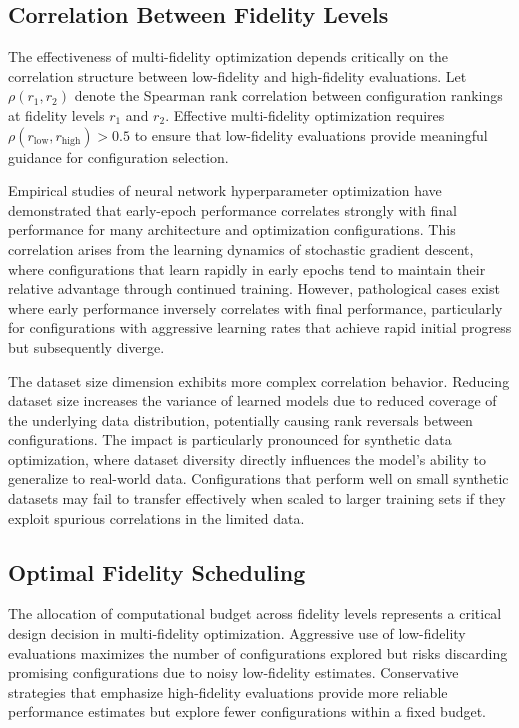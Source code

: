 \subsection{Correlation Between Fidelity Levels}

The effectiveness of multi-fidelity optimization depends critically on the correlation structure between low-fidelity and high-fidelity evaluations. Let $\rho(r_1, r_2)$ denote the Spearman rank correlation between configuration rankings at fidelity levels $r_1$ and $r_2$. Effective multi-fidelity optimization requires $\rho(r_{\text{low}}, r_{\text{high}}) > 0.5$ to ensure that low-fidelity evaluations provide meaningful guidance for configuration selection.

Empirical studies of neural network hyperparameter optimization have demonstrated that early-epoch performance correlates strongly with final performance for many architecture and optimization configurations. This correlation arises from the learning dynamics of stochastic gradient descent, where configurations that learn rapidly in early epochs tend to maintain their relative advantage through continued training. However, pathological cases exist where early performance inversely correlates with final performance, particularly for configurations with aggressive learning rates that achieve rapid initial progress but subsequently diverge.

The dataset size dimension exhibits more complex correlation behavior. Reducing dataset size increases the variance of learned models due to reduced coverage of the underlying data distribution, potentially causing rank reversals between configurations. The impact is particularly pronounced for synthetic data optimization, where dataset diversity directly influences the model's ability to generalize to real-world data. Configurations that perform well on small synthetic datasets may fail to transfer effectively when scaled to larger training sets if they exploit spurious correlations in the limited data.

\subsection{Optimal Fidelity Scheduling}

The allocation of computational budget across fidelity levels represents a critical design decision in multi-fidelity optimization. Aggressive use of low-fidelity evaluations maximizes the number of configurations explored but risks discarding promising configurations due to noisy low-fidelity estimates. Conservative strategies that emphasize high-fidelity evaluations provide more reliable performance estimates but explore fewer configurations within a fixed budget.

